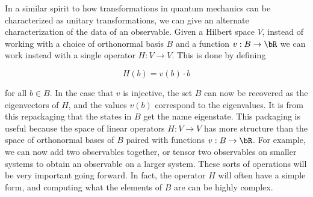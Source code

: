 \begin{rem}
In a similar spirit to how transformations in quantum mechanics can be characterized as unitary transformations, we can give an alternate characterization of the data of an observable. Given a Hilbert space $V$, instead of working with a choice of orthonormal basis $B$ and a function $v:B\to \bR$ we can work instead with a single operator $H:V\to V$. This is done by defining

$$H(b)=v(b)\cdot b$$

for all $b\in B$. In the case that $v$ is injective, the set $B$ can now be recovered as the eigenvectors of $H$, and the values $v(b)$ correspond to the eigenvalues. It is from this repackaging that the states in $B$ get the name eigenstate. This packaging is useful because the space of linear operators $H:V\to V$ has more structure than the space of orthonormal bases of $B$ paired with functions $v:B\to \bR$. For example, we can now add two observables together, or tensor two observables on smaller systems to obtain an observable on a larger system. These sorts of operations will be very important going forward. In fact, the operator $H$ will often have a simple form, and computing what the elements of $B$ are can be highly complex.

\end{rem}

